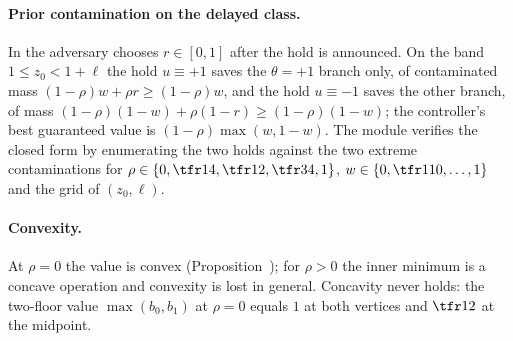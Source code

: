 \paragraph{Prior contamination on the delayed class.} In  the adversary chooses $r\in[0,1]$ after the hold is announced. On the band $1\le z_0<1+\ell$ the hold $u\equiv+1$ saves the $\theta=+1$ branch only, of contaminated mass $(1-\rho)w+\rho r\ge(1-\rho)w$, and the hold $u\equiv-1$ saves the other branch, of mass $(1-\rho)(1-w)+\rho(1-r)\ge(1-\rho)(1-w)$; the controller's best guaranteed value is $(1-\rho)\max(w,1-w)$. The module verifies the closed form by enumerating the two holds against the two extreme contaminations for $\rho\in\{0,\tfr14,\tfr12,\tfr34,1\}$, $w\in\{0,\tfr1{10},\dots,1\}$ and the grid of $(z_0,\ell)$.

\paragraph{Convexity.} At $\rho=0$ the value is convex (Proposition~); for $\rho>0$ the inner minimum is a concave operation and convexity is lost in general. Concavity never holds: the two-floor value $\max(b_0,b_1)$ at $\rho=0$ equals $1$ at both vertices and $\tfr12$ at the midpoint.
